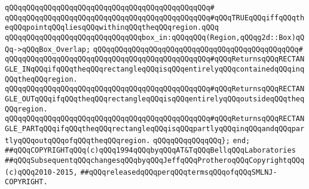 \verb|qQQqqQQqqQQqqQQqqQQqqQQqqQQqqQQqqQQqqQQqqQQqqQQq#|\newline
\verb|qQQqqQQqqQQqqQQqqQQqqQQqqQQqqQQqqQQqqQQqqQQqqQQq#qQQqTRUEqQQqiffqQQqtheqQQqpointqQQqliesqQQqwithinqQQqtheqQQqregion.qQQq|\newline
\newline
\newline
\verb|qQQqqQQqqQQqqQQqqQQqqQQqqQQqqQQqbox_in:qQQqqQQq(Region,qQQqg2d::Box)qQQq->qQQqBox_Overlap;|\newline
\verb|qQQqqQQqqQQqqQQqqQQqqQQqqQQqqQQqqQQqqQQqqQQqqQQq#|\newline
\verb|qQQqqQQqqQQqqQQqqQQqqQQqqQQqqQQqqQQqqQQqqQQqqQQq#qQQqReturnsqQQqRECTANGLE_INqQQqifqQQqtheqQQqrectangleqQQqisqQQqentirelyqQQqcontainedqQQqinqQQqtheqQQqregion.|\newline
\verb|qQQqqQQqqQQqqQQqqQQqqQQqqQQqqQQqqQQqqQQqqQQqqQQq#qQQqReturnsqQQqRECTANGLE_OUTqQQqifqQQqtheqQQqrectangleqQQqisqQQqentirelyqQQqoutsideqQQqtheqQQqregion.|\newline
\verb|qQQqqQQqqQQqqQQqqQQqqQQqqQQqqQQqqQQqqQQqqQQqqQQq#qQQqReturnsqQQqRECTANGLE_PARTqQQqifqQQqtheqQQqrectangleqQQqisqQQqpartlyqQQqinqQQqandqQQqpartlyqQQqoutqQQqofqQQqtheqQQqregion.|\newline
\verb|qQQqqQQqqQQqqQQq};|\newline
\verb|end;|\newline
\newline
\newline
\verb|##qQQqCOPYRIGHTqQQq(c)qQQq1994qQQqbyqQQqAT&TqQQqBellqQQqLaboratories|\newline
\verb|##qQQqSubsequentqQQqchangesqQQqbyqQQqJeffqQQqProtheroqQQqCopyrightqQQq(c)qQQq2010-2015,|\newline
\verb|##qQQqreleasedqQQqperqQQqtermsqQQqofqQQqSMLNJ-COPYRIGHT.|\newline

